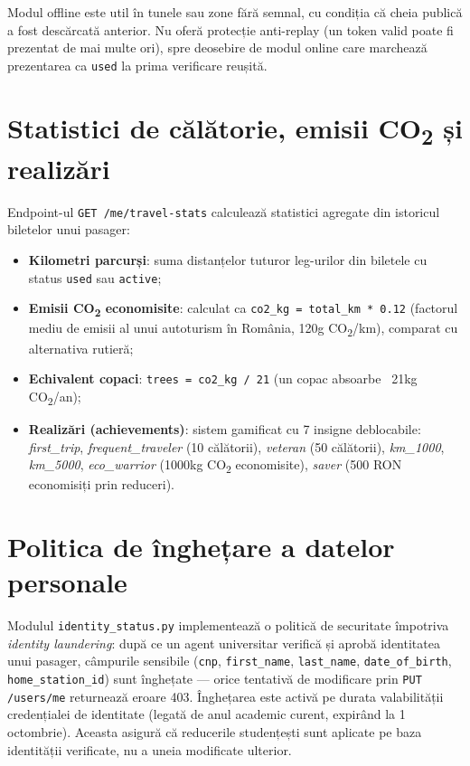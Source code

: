 \documentclass[12pt,a4paper]{report}
\begin{document}
Modul offline este util în tunele sau zone fără semnal, cu condiția că cheia publică a fost descărcată anterior. Nu oferă protecție anti-replay (un token valid poate fi prezentat de mai multe ori), spre deosebire de modul online care marchează prezentarea ca \texttt{used} la prima verificare reușită.

\section{Statistici de călătorie, emisii CO\textsubscript{2} și realizări}

Endpoint-ul \texttt{GET /me/travel-stats} calculează statistici agregate din istoricul biletelor unui pasager:

\begin{itemize}
  \item \textbf{Kilometri parcurși}: suma distanțelor tuturor leg-urilor din biletele cu status \texttt{used} sau \texttt{active};
  \item \textbf{Emisii CO\textsubscript{2} economisite}: calculat ca \texttt{co2\_kg = total\_km * 0.12} (factorul mediu de emisii al unui autoturism în România, 120g CO\textsubscript{2}/km), comparat cu alternativa rutieră;
  \item \textbf{Echivalent copaci}: \texttt{trees = co2\_kg / 21} (un copac absoarbe ~21kg CO\textsubscript{2}/an);
  \item \textbf{Realizări (achievements)}: sistem gamificat cu 7 insigne deblocabile: \textit{first\_trip}, \textit{frequent\_traveler} (10 călătorii), \textit{veteran} (50 călătorii), \textit{km\_1000}, \textit{km\_5000}, \textit{eco\_warrior} (1000kg CO\textsubscript{2} economisite), \textit{saver} (500 RON economisiți prin reduceri).
\end{itemize}

\section{Politica de înghețare a datelor personale}

Modulul \texttt{identity\_status.py} implementează o politică de securitate împotriva \textit{identity laundering}: după ce un agent universitar verifică și aprobă identitatea unui pasager, câmpurile sensibile (\texttt{cnp}, \texttt{first\_name}, \texttt{last\_name}, \texttt{date\_of\_birth}, \texttt{home\_station\_id}) sunt înghețate — orice tentativă de modificare prin \texttt{PUT /users/me} returnează eroare 403. Înghețarea este activă pe durata valabilității credențialei de identitate (legată de anul academic curent, expirând la 1 octombrie). Aceasta asigură că reducerile studențești sunt aplicate pe baza identității verificate, nu a uneia modificate ulterior.
\end{document}
